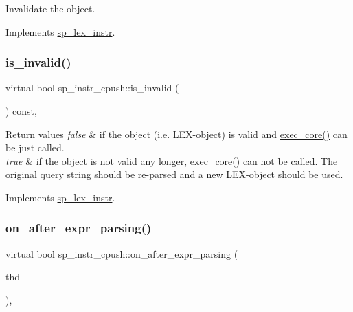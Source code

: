 Invalidate the object. 

Implements \mbox{\hyperlink{classsp__lex__instr_ae9945d69ab5d91d6ce215f194beea882}{sp\+\_\+lex\+\_\+instr}}.

\mbox{\label{classsp__instr__cpush_a05c39644e6c5fd40fd72123b9d7d025d}} 
\subsubsection{\texorpdfstring{is\+\_\+invalid()}{is\_invalid()}}
{\footnotesize\ttfamily virtual bool sp\+\_\+instr\+\_\+cpush\+::is\+\_\+invalid (\begin{DoxyParamCaption}{ }\end{DoxyParamCaption}) const\hspace{0.3cm}{\ttfamily [inline]}, {\ttfamily [virtual]}}


\begin{DoxyRetVals}{Return values}
{\em false} & if the object (i.\+e. L\+EX-\/object) is valid and \mbox{\hyperlink{classsp__instr__cpush_a29936e62ed32e5db6d5a3fdd624fe969}{exec\+\_\+core()}} can be just called.\\
\hline
{\em true} & if the object is not valid any longer, \mbox{\hyperlink{classsp__instr__cpush_a29936e62ed32e5db6d5a3fdd624fe969}{exec\+\_\+core()}} can not be called. The original query string should be re-\/parsed and a new L\+EX-\/object should be used. \\
\hline
\end{DoxyRetVals}


Implements \mbox{\hyperlink{classsp__lex__instr_a56788cb475ccf94f224816006d9c90e9}{sp\+\_\+lex\+\_\+instr}}.

\mbox{\label{classsp__instr__cpush_a5679b6d149a1941a84bc41ddc42848d6}} 
\subsubsection{\texorpdfstring{on\+\_\+after\+\_\+expr\+\_\+parsing()}{on\_after\_expr\_parsing()}}
{\footnotesize\ttfamily virtual bool sp\+\_\+instr\+\_\+cpush\+::on\+\_\+after\+\_\+expr\+\_\+parsing (\begin{DoxyParamCaption}\item[{T\+HD $\ast$}]{thd }\end{DoxyParamCaption})\hspace{0.3cm}{\ttfamily [inline]}, {\ttfamily [virtual]}}

